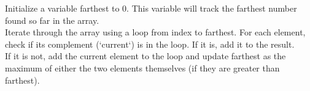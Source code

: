 \documentclass[preview]{standalone}
\begin{document}
Initialize a variable farthest to 0. This variable will track the farthest number found so far in the array.\\Iterate through the array using a loop from index to farthest. For each element, check if its complement (`current`) is in the loop. If it is, add it to the result.\\If it is not, add the current element to the loop and update farthest as the maximum of either the two elements themselves (if they are greater than farthest).\\
\end{document}
